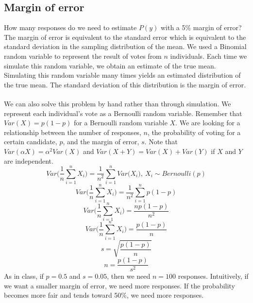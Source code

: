 \subsection{Margin of error}
How many responses do we need to estimate $P(y)$ with a 5\% margin of error? The margin of error is equivalent to the standard error which is equivalent to the standard deviation in the sampling distribution of the mean. We used a Binomial random variable to represent the result of votes from $n$ individuals. Each time we simulate this random variable, we obtain an estimate of the true mean. Simulating this random variable many times yields an estimated distribution of the true mean. The standard deviation of this distribution is the margin of error.\\\\
We can also solve this problem by hand rather than through simulation. We represent each individual's vote as a Bernoulli random variable. Remember that $Var(X) = p(1-p)$ for a Bernoulli random variable $X$. We are looking for a relationship between the number of responses, $n$, the probability of voting for a certain candidate, $p$, and the margin of error, $s$. Note that $Var(\alpha X) = \alpha^2 Var(X)$ and $Var(X + Y) = Var(X) + Var(Y)$ if $X$ and $Y$ are independent.
$$Var\bigg(\frac{1}{n} \sum_{i=1}^n X_i\bigg) = \frac{1}{n^2}\sum_{i=1}^n Var\bigg(X_i\bigg), \ X_i \sim Bernoulli(p)$$
$$Var\bigg(\frac{1}{n} \sum_{i=1}^n X_i\bigg) = \frac{1}{n^2}\sum_{i=1}^n p(1-p)$$
$$Var\bigg(\frac{1}{n} \sum_{i=1}^n X_i\bigg) = \frac{np(1-p)}{n^2}$$
$$Var\bigg(\frac{1}{n} \sum_{i=1}^n X_i\bigg) = \frac{p(1-p)}{n}$$
$$s = \sqrt{\frac{p(1-p)}{n}}$$
$$n = \frac{p(1-p)}{s^2}$$
As in class, if $p = 0.5$ and $s = 0.05$, then we need $n = 100$ responses. Intuitively, if we want a smaller margin of error, we need more responses. If the probability becomes more fair and tends toward 50\%, we need more responses.

